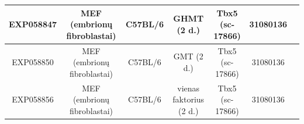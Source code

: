 \documentclass[12pt]{article}
\begin{document}
\begin{table}[htb]
\begin{tabular}{|c|c|c|c|c|c|c|}
    \hline
    EXP058847 & \thead{MEF\\ (embrionų fibroblastai)} & C57BL/6 & GHMT (2 d.) &
                \thead{Tbx5\\ (sc-17866)} & 31080136\cite{ARTCL2}\\
    \hline
    EXP058850 & \thead{MEF\\ (embrionų fibroblastai)} & C57BL/6 & GMT (2 d.) &
                \thead{Tbx5\\ (sc-17866)} & 31080136\cite{ARTCL2}\\
    \hline
    EXP058856 & \thead{MEF\\ (embrionų fibroblastai)} & C57BL/6 &
                \thead{vienas\\ faktorius (2 d.)} & \thead{Tbx5\\ (sc-17866)} &
                31080136\cite{ARTCL2}\\
    \hline
    \end{tabular}
\end{table}

\newpage
\end{document}
